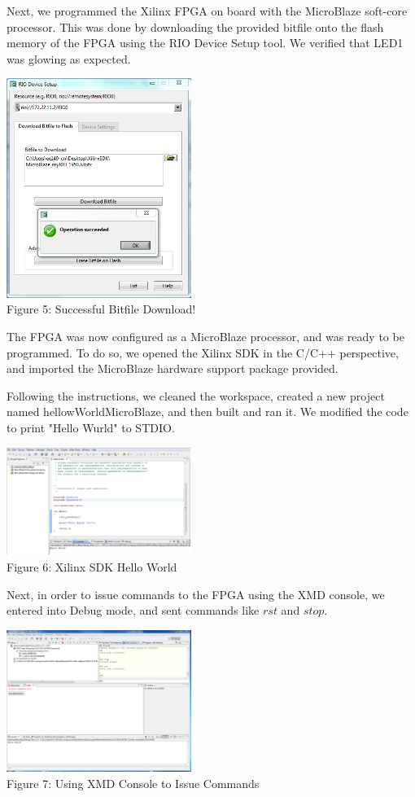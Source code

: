 \documentclass[twoside]{article}
\begin{document}
\begin{multicols}{2}
\noindent Next, we programmed the Xilinx FPGA on board with the MicroBlaze soft-core processor. This was done by downloading the provided bitfile onto the flash memory of the FPGA using the RIO Device Setup tool. We verified that LED1 was glowing as expected.

\begin{center}
\includegraphics*[width = 6cm]{Fig5.png}\\
Figure 5: Successful Bitfile Download!
\end{center}

The FPGA was now configured as a MicroBlaze processor, and was ready to be programmed. To do so, we opened the Xilinx SDK in the C/C++ perspective, and imported the MicroBlaze hardware support package provided.

Following the instructions, we cleaned the workspace, created a new project named hellowWorldMicroBlaze, and then built and ran it. We modified the code to print "Hello Wurld" to STDIO. 

\begin{center}
\includegraphics*[width = 6cm]{Fig6_1.png}\\
Figure 6: Xilinx SDK Hello World
\end{center}

Next, in order to issue commands to the FPGA using the XMD console, we entered into Debug mode, and sent commands like $rst$ and $stop$. 

\begin{center}
\includegraphics*[width = 6cm]{Fig7.png}\\
Figure 7: Using XMD Console to Issue Commands
\end{center}



\end{multicols}
\end{document}
